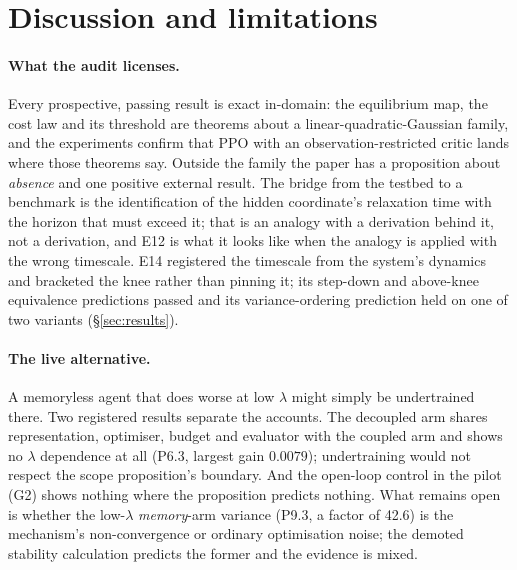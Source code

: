 
\section{Discussion and limitations}
\label{sec:discussion}

\paragraph{What the audit licenses.} Every prospective, passing result is
exact in-domain: the equilibrium map, the cost law and its threshold are
theorems about a linear-quadratic-Gaussian family, and the experiments confirm
that PPO with an observation-restricted critic lands where those theorems say.
Outside the family the paper has a proposition about \emph{absence} and one
positive external result. The bridge from the testbed to a benchmark is the
identification of the hidden coordinate's relaxation time with the horizon
that must exceed it; that is an analogy with a derivation behind it, not a
derivation, and E12 is what it looks like when the analogy is applied with the
wrong timescale. E14 registered the timescale from the system's dynamics and
bracketed the knee rather than pinning it; its step-down and above-knee
equivalence predictions passed and its variance-ordering prediction held on one
of two variants (\S\ref{sec:results}).

\paragraph{The live alternative.} A memoryless agent that does worse at low
$\lambda$ might simply be undertrained there. Two registered results
separate the accounts. The decoupled arm shares representation, optimiser,
budget and evaluator with the coupled arm and shows no $\lambda$ dependence
at all (P6.3, largest gain $0.0079$); undertraining would not respect the
scope proposition's boundary. And the open-loop control in the pilot (G2)
shows nothing where the proposition predicts nothing. What remains open is
whether the low-$\lambda$ \emph{memory}-arm variance (P9.3, a factor of 42.6)
is the mechanism's non-convergence or ordinary optimisation noise; the
demoted stability calculation predicts the former and the evidence is mixed.

